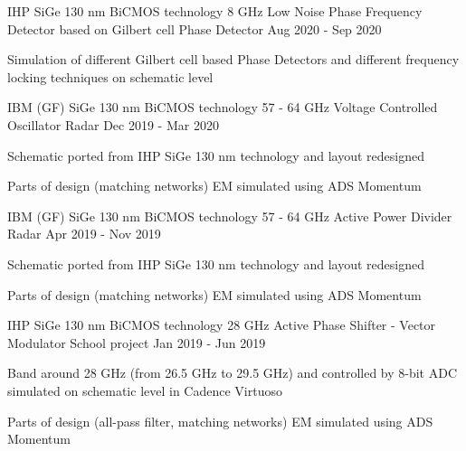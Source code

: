 \begin{cventries}

\cventry
{IHP SiGe 130 nm BiCMOS technology} %
{8 GHz Low Noise Phase Frequency Detector based on Gilbert cell} %
{Phase Detector} %
{Aug 2020 - Sep 2020} %
{ %
\begin{cvitems}
    \item {Simulation of different Gilbert cell based Phase Detectors and different frequency locking techniques on schematic level}
\end{cvitems} 
}


\cventry
{IBM (GF) SiGe 130 nm BiCMOS technology} %
{57 - 64 GHz Voltage Controlled Oscillator} %
{Radar} %
{Dec 2019 - Mar 2020} %
{ %
\begin{cvitems}
    \item {Schematic ported from IHP SiGe 130 nm technology and layout redesigned}
    \item {Parts of design (matching networks) EM simulated using ADS Momentum}
\end{cvitems} 
}


\cventry
{IBM (GF) SiGe 130 nm BiCMOS technology} %
{57 - 64 GHz Active Power Divider} %
{Radar} %
{Apr 2019 - Nov 2019} %
{ %
\begin{cvitems}
    \item {Schematic ported from IHP SiGe 130 nm technology and layout redesigned}
    \item {Parts of design (matching networks) EM simulated using ADS Momentum}
\end{cvitems} 
}


\cventry
{IHP SiGe 130 nm BiCMOS technology} %
{28 GHz Active Phase Shifter - Vector Modulator} %
{School project} %
{Jan 2019 - Jun 2019} %
{ %
\begin{cvitems}
    \item {Band around 28 GHz (from 26.5 GHz to 29.5 GHz) and controlled by 8-bit ADC simulated on schematic level in Cadence Virtuoso}
    \item {Parts of design (all-pass filter, matching networks) EM simulated using ADS Momentum}
\end{cvitems} 
}


\end{cventries}
